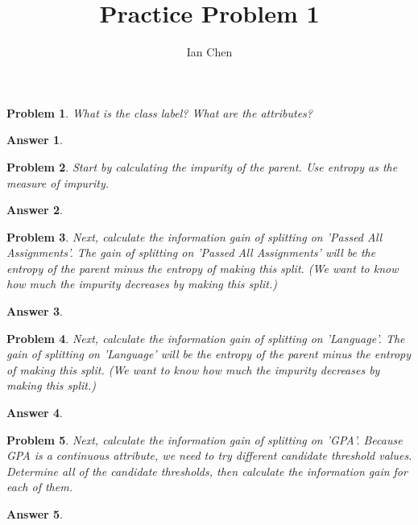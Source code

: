 \documentclass[11pt]{article}
\author{Ian Chen}
\title{Practice Problem 1}
\theoremstyle{description}
\newtheorem{problem}{Problem}
\theoremstyle{break}
\newtheorem*{answer}{Answer}
\begin{document}
    \maketitle

    \setcounter{problem}{-1}
    \begin{problem}
        What is the class label?
        What are the attributes?
    \end{problem}
    \begin{answer}
    \end{answer}

    \begin{problem}
        Start by calculating the impurity of the parent.
        Use entropy as the measure of impurity.
    \end{problem}
    \begin{answer}
    \end{answer}

    \begin{problem}
        Next, calculate the information gain of splitting on 'Passed All Assignments'.
        The gain of splitting on 'Passed All Assignments' will be the entropy of the parent minus
        the entropy of making this split.
        (We want to know how much the impurity decreases by making this split.)
    \end{problem}
    \begin{answer}
    \end{answer}

    \begin{problem}
        Next, calculate the information gain of splitting on 'Language'.
        The gain of splitting on 'Language' will be the entropy of the parent minus the entropy of
        making this split.
        (We want to know how much the impurity decreases by making this split.)
    \end{problem}
    \begin{answer}
    \end{answer}

    \begin{problem}
        Next, calculate the information gain of splitting on 'GPA'.
        Because GPA is a continuous attribute, we need to try different candidate threshold values.
        Determine all of the candidate thresholds, then calculate the information gain for each
        of them.
    \end{problem}
    \begin{answer}
    \end{answer}
\end{document}
